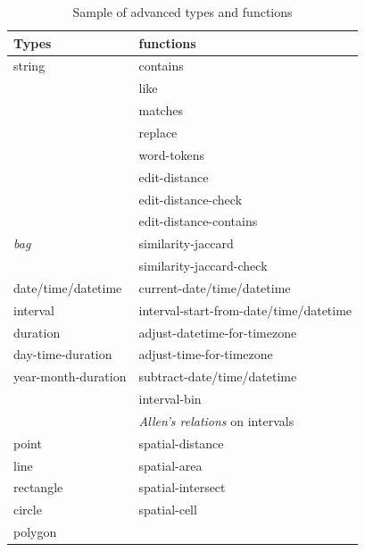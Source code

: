 \begin{table} [htbp]
\centering
\small
\begin{tabular}{|l|l|}
\hline %
\textbf{Types}      & \textbf{functions}                     \\
\hline %
string              & contains                               \\
                    & like                                   \\
                    & matches                                \\
                    & replace                                \\
                    & word-tokens                            \\
                    & edit-distance                          \\
                    & edit-distance-check                    \\
                    & edit-distance-contains                 \\
\hline %
\emph{bag}          & similarity-jaccard                     \\
                    & similarity-jaccard-check               \\
\hline %
date/time/datetime  & current-date/time/datetime             \\
interval            & interval-start-from-date/time/datetime \\
duration            & adjust-datetime-for-timezone           \\
day-time-duration   & adjust-time-for-timezone               \\
year-month-duration & subtract-date/time/datetime            \\
                    & interval-bin                           \\
                    & \emph{Allen's relations} on intervals  \\\hline %
point               & spatial-distance                       \\
line                & spatial-area                           \\
rectangle           & spatial-intersect                      \\
circle              & spatial-cell                           \\
polygon             &                                        \\
\hline %
\end{tabular}
\caption{Sample of advanced types and functions\label{tab:types}}
\end{table}

